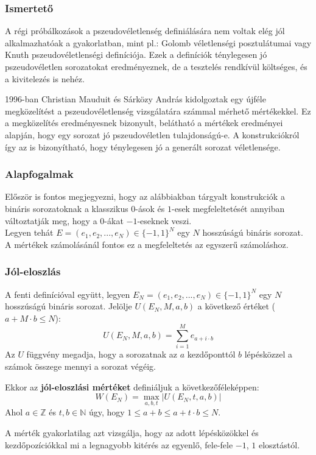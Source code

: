 \documentclass[12pt]{article}
\begin{document}
	\subsubsection{Ismertető}
	A régi próbálkozások a pszeudovéletlenség definiálására nem voltak elég jól alkalmazhatóak a gyakorlatban, mint pl.: Golomb véletlenségi posztulátumai vagy Knuth pszeudovéletlenségi definíciója. Ezek a definíciók ténylegesen jó pszeudovéletlen sorozatokat eredményeznek, de a tesztelés rendkívül költséges, és a kivitelezés is nehéz.
	
	1996-ban Christian Mauduit és Sárközy András kidolgoztak egy újféle megközelítést a pszeudovéletlenség vizsgálatára számmal mérhető mértékekkel. Ez a megközelítés eredményesnek bizonyult, belátható a mértékek eredményei alapján, hogy egy sorozat jó pszeudovéletlen tulajdonságú-e. A konstrukciókról így az is bizonyítható, hogy ténylegesen jó a generált sorozat véletlensége.
	\subsubsection{Alapfogalmak}
	Először is fontos megjegyezni, hogy az alábbiakban tárgyalt konstrukciók a bináris sorozatoknak a klasszikus $0$-ások és $1$-esek megfeleltetését annyiban változtatják meg, hogy a $0$-ákat $-1$-eseknek veszi. \\
	Legyen tehát $E=(e_1, e_2, ..., e_N) \in \{-1, 1\}^N$ egy $N$ hosszúságú bináris sorozat. A mértékek számolásánál fontos ez a megfeleltetés az egyszerű számoláshoz.
	\subsubsection*{Jól-eloszlás}
	A fenti definícióval együtt, legyen $E_N=(e_1, e_2, ..., e_N) \in \{-1, 1\}^N$ egy $N$ hosszúságú bináris sorozat. Jelölje $U(E_N, M, a, b)$ a következő értéket ($a+M\cdot b \leq N$):
	$$U(E_N, M, a, b) = \sum_{i=1}^{M}e_{a+i\cdot b}$$
	Az $U$ függvény megadja, hogy a sorozatnak az $a$ kezdőponttól $b$ lépésközzel a számok összege mennyi a sorozat végéig.
	
	Ekkor az \textbf{jól-eloszlási mértéket} definiáljuk a következőféleképpen:
	$$W(E_N) = \max_{a, b, t}{|U(E_N, t, a, b)|}$$
	Ahol $a \in \mathbb{Z}$ és $t, b \in \mathbb{N}$ úgy, hogy $1 \leq a+b \leq a+t\cdot b \leq N$.
	
	A mérték gyakorlatilag azt vizsgálja, hogy az adott lépésközökkel és kezdőpozíciókkal mi a legnagyobb kitérés az egyenlő, fele-fele $-1$, $1$ elosztástól.
	
\end{document}
